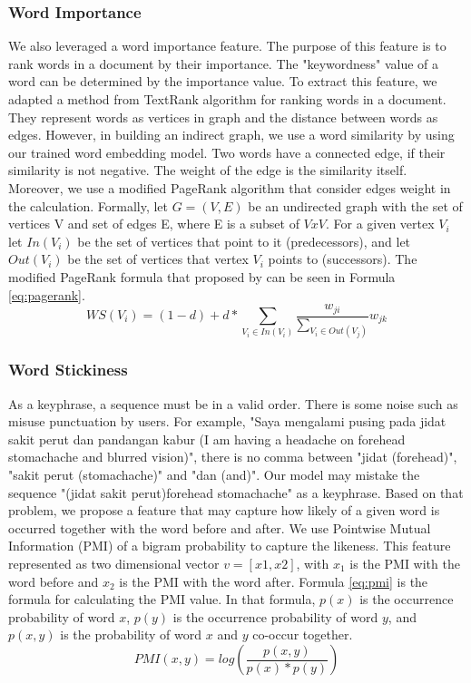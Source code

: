 \subsubsection{Word Importance\\}
We also leveraged a word importance feature. The purpose of this feature is to rank words in a document by their importance. The "keywordness" value of a word can be determined by the importance value. To extract this feature, we adapted a method from TextRank \cite{mihalcea2004textrank} algorithm for ranking words in a document. They represent words as vertices in graph and the distance between words as edges. However, in building an indirect graph, we use a word similarity by using our trained word embedding model. Two words have a connected edge, if their similarity is not negative. The weight of the edge is the similarity itself. Moreover, we use a modified PageRank \cite{page1999pagerank} algorithm that consider edges weight in the calculation. Formally, let $G = (V, E)$ be an undirected graph with the set of vertices V and set of edges E, where E is a subset of $VxV$. For a given vertex $V_i$ let $In(V_i)$ be the set of vertices that point to it (predecessors), and let $Out(V_i)$ be the set of vertices that vertex $V_i$ points to (successors). The modified PageRank formula that proposed by \cite{mihalcea2004textrank} can be seen in Formula \ref{eq:pagerank}.
\begin{equation}\label{eq:pagerank}
	WS(V_{i})=(1-d) + d * \sum_{V_{i} \in In(V_{i})} \frac{w_{ji}}{\sum_{V_{i} \in Out(V_{j})}}w_{jk}
\end{equation}

\subsubsection{Word Stickiness\\}
As a keyphrase, a sequence must be in a valid order. There is some noise such as misuse punctuation by users. For example, "Saya mengalami pusing pada jidat sakit perut dan pandangan kabur (I am having a headache on forehead stomachache and blurred vision)", there is no comma between "jidat (forehead)", "sakit perut (stomachache)" and "dan (and)". Our model may mistake the sequence "(jidat sakit perut)forehead stomachache" as a keyphrase. Based on that problem, we propose a feature that may capture how likely of a given word is occurred together with the word before and after. We use Pointwise Mutual Information (PMI) of a bigram probability to capture the likeness. This feature represented as two dimensional vector $v = [x1, x2]$, with $x_1$ is the PMI with the word before and $x_2$ is the PMI with the word after. Formula \ref{eq:pmi} is the formula for calculating the PMI value. In that formula, $p(x)$ is the occurrence probability of word $x$, $p(y)$ is the occurrence probability of word $y$, and $p(x, y)$ is the probability of word $x$ and $y$ co-occur together.
\begin{equation}\label{eq:pmi}
	PMI(x,y)=log(\frac{p(x, y)}{p(x)*p(y)})
\end{equation} 
